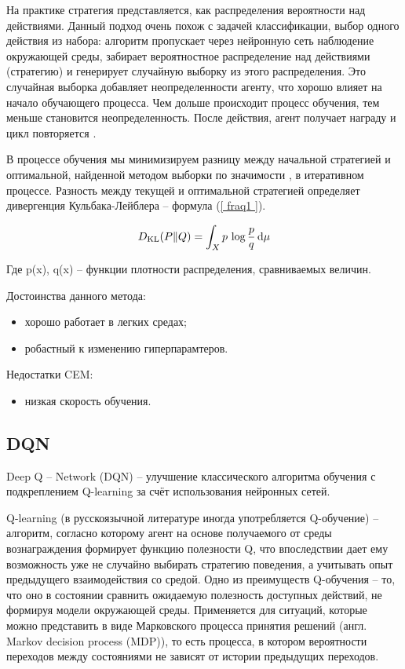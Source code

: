 На практике стратегия представляется, как распределения вероятности над действиями. 
Данный подход очень похож с задачей классификации, выбор одного действия из набора: алгоритм пропускает через нейронную сеть наблюдение окружающей среды, забирает вероятностное распределение над действиями (стратегию) и генерирует случайную выборку из этого распределения. 
Это случайная выборка добавляет неопределенности агенту, что хорошо влияет на начало обучающего процесса. Чем дольше происходит процесс обучения, тем меньше становится неопределенность. 
После действия, агент получает награду и цикл повторяется \cite{CEM}.

В процессе обучения мы минимизируем разницу между начальной стратегией и оптимальной, найденной методом выборки по значимости \cite{CEM1}, в итеративном процессе. 
Разность между текущей и оптимальной стратегией определяет дивергенция Кульбака-Лейблера -- формула (\ref{ fraq1 }).

\begin{equation}\label{ fraq1 }
\displaystyle D_{\mathrm {KL} }(P\|Q)=\int _{X}p\,\log {\frac {p}{q}}\,{\rm {d}}\mu 
\end{equation}

Где p(x), q(x) -- функции плотности распределения, сравниваемых величин.

Достоинства данного метода:
\begin{itemize}
	\item хорошо работает в легких средах;
	\item робастный к изменению гиперпарамтеров.
\end{itemize}

Недостатки CEM:
\begin{itemize}
	\item низкая скорость обучения.
\end{itemize}

\subsection{DQN}

Deep Q – Network (DQN) – улучшение классического алгоритма обучения с подкреплением Q-learning за счёт использования нейронных сетей.

Q-learning (в русскоязычной литературе иногда употребляется Q-обучение) – алгоритм, согласно которому агент на основе получаемого от среды вознаграждения формирует функцию полезности Q, что впоследствии дает ему возможность уже не случайно выбирать стратегию поведения, а учитывать опыт предыдущего взаимодействия со средой. 
Одно из преимуществ Q-обучения -- то, что оно в состоянии сравнить ожидаемую полезность доступных действий, не формируя модели окружающей среды. 
Применяется для ситуаций, которые можно представить в виде Марковского процесса принятия решений (англ. Markov decision process (MDP)), то есть процесса, в котором вероятности переходов между состояниями не зависят от истории предыдущих переходов. 

